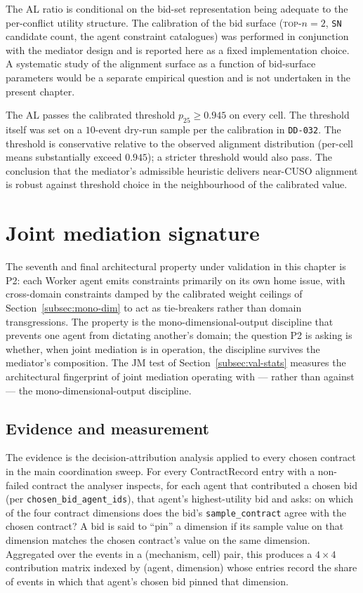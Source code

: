 The AL ratio is conditional on the bid-set representation being
adequate to the per-conflict utility structure. The calibration of
the bid surface (\textsc{top-}$n = 2$, \texttt{SN} candidate count,
the agent constraint catalogues) was performed in conjunction with
the mediator design and is reported here as a fixed implementation
choice. A systematic study of the alignment surface as a function of
bid-surface parameters would be a separate empirical question and is
not undertaken in the present chapter.

The AL passes the calibrated threshold $p_{25} \ge 0.945$ on every
cell. The threshold itself was set on a $10$-event dry-run sample
per the calibration in \texttt{DD-032}. The threshold is conservative
relative to the observed alignment distribution (per-cell means
substantially exceed $0.945$); a stricter threshold would also pass.
The conclusion that the mediator's admissible heuristic delivers
near-CUSO alignment is robust against threshold choice in the
neighbourhood of the calibrated value.

\section{Joint mediation signature}
\label{sec:val-attribution}

The seventh and final architectural property under validation in this
chapter is P2: each Worker agent emits constraints primarily on its
own home issue, with cross-domain constraints damped by the
calibrated weight ceilings of Section~\ref{subsec:mono-dim} to act
as tie-breakers rather than domain transgressions. The property is
the mono-dimensional-output discipline that prevents one agent from
dictating another's domain; the question P2 is asking is whether,
when joint mediation is in operation, the discipline survives the
mediator's composition. The JM test of
Section~\ref{subsec:val-stats} measures the architectural fingerprint
of joint mediation operating with --- rather than against --- the
mono-dimensional-output discipline.

\subsection*{Evidence and measurement}

The evidence is the decision-attribution analysis applied to every
chosen contract in the main coordination sweep. For every
ContractRecord entry with a non-failed contract the analyser
inspects, for each agent that contributed a chosen bid (per
\texttt{chosen\_bid\_agent\_ids}), that agent's highest-utility bid
and asks: on which of the four contract dimensions does the bid's
\texttt{sample\_contract} agree with the chosen contract? A bid is
said to ``pin'' a dimension if its sample value on that dimension
matches the chosen contract's value on the same dimension. Aggregated
over the events in a (mechanism, cell) pair, this produces a
$4 \times 4$ contribution matrix indexed by (agent, dimension)
whose entries record the share of events in which that agent's
chosen bid pinned that dimension.

